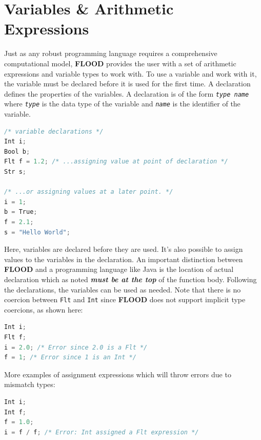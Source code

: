 \documentclass[12pt]{report}
\begin{document}
\section{Variables \& Arithmetic Expressions}

Just as any robust programming language requires a comprehensive computational model, \textbf{FLOOD} provides the user with a set of arithmetic expressions and variable types to work with. To use a variable and work with it, the variable must be declared before it is used for the first time. A declaration defines the properties of the variables. A declaration is of the form \textit{\texttt{type name}} where \textit{\texttt{type}} is the data type of the variable and \textit{\texttt{name}} is the identifier of the variable.

\begin{singlespace}
\begin{lstlisting}[language=Java,label=some-code,caption={Variable declarations.}]
/* variable declarations */
Int i;
Bool b;
Flt f = 1.2; /* ...assigning value at point of declaration */
Str s;

/* ...or assigning values at a later point. */
i = 1;
b = True;
f = 2.1;
s = "Hello World";
\end{lstlisting}
\end{singlespace}

Here, variables are declared before they are used. It's also possible to assign values to the variables in the declaration. An important distinction between \textbf{FLOOD} and a programming language like Java is the location of actual declaration which as noted \textit{\textbf{must be at the top}} of the function body. Following the declarations, the variables can be used as needed. Note that there is no coercion between \texttt{Flt} and \texttt{Int} since \textbf{FLOOD} does not support implicit type coercions, as shown here:

\begin{singlespace}
\begin{lstlisting}[language=Java,label=some-code,caption={Implicit type coersion is not supported.}]
Int i;
Flt f;
i = 2.0; /* Error since 2.0 is a Flt */
f = 1; /* Error since 1 is an Int */
\end{lstlisting}
\end{singlespace}

More examples of assignment expressions which will throw errors due to mismatch types:

\begin{singlespace}
\begin{lstlisting}[language=Java,label=some-code,caption=More errors due to mistmatch type declarations and assignments]
Int i;
Int f;
f = 1.0;
i = f / f; /* Error: Int assigned a Flt expression */
\end{lstlisting}
\end{singlespace}
\end{document}
